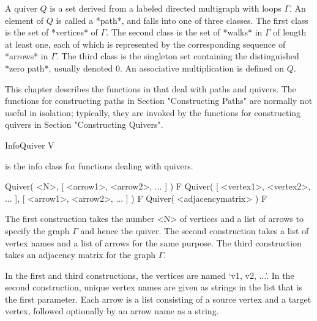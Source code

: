 %
%
%

A quiver $Q$ is a set derived from a labeled directed multigraph
with loops $\Gamma$.
An element of $Q$ is called a *path*,
and falls into one of three classes.
The first class is the set of *vertices* of $\Gamma$.
The second class is the set of *walks* in $\Gamma$ of length at least one,
each of which is represented
by the corresponding sequence of *arrows* in $\Gamma$.
The third class is the singleton set containing the distinguished *zero path*,
usually denoted $0$.
An associative multiplication is defined on $Q$.

This chapter describes the functions in {\QPA} that deal with paths
and quivers.
The functions for constructing paths in Section "Constructing Paths"
are normally not useful in isolation;
typically,
they are invoked by the functions for constructing quivers
in Section "Constructing Quivers".

\>InfoQuiver V

is the info class for functions dealing with quivers.



\>Quiver( <N>, [ <arrow1>, <arrow2>, ... ] ) F
\>Quiver( [ <vertex1>, <vertex2>, ... ], [ <arrow1>, <arrow2>, ... ] ) F
\>Quiver( <adjacencymatrix> ) F

The first construction takes the number <N> of vertices
and a list of arrows to specify the graph $\Gamma$
and hence the quiver.
The second construction takes a list of vertex names
and a list of arrows for the same purpose.
The third construction takes an adjacency matrix
for the graph $\Gamma$.

In the first and third constructions,
the vertices are named `v1, v2, ...'.
In the second construction,
unique vertex names are given as strings
in the list that is the first parameter.
Each arrow is a list consisting of a source vertex and a target vertex,
followed optionally by an arrow name as a string.

